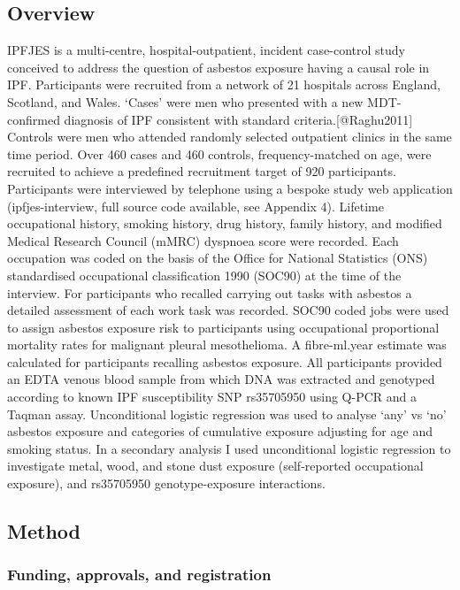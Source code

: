 \hypertarget{overview}{%
\subsection{Overview}\label{overview}}

IPFJES is a multi-centre, hospital-outpatient, incident case-control
study conceived to address the question of asbestos exposure having a
causal role in IPF. Participants were recruited from a network of 21
hospitals across England, Scotland, and Wales. `Cases' were men who
presented with a new MDT-confirmed diagnosis of IPF consistent with
standard criteria.{[}@Raghu2011{]} Controls were men who attended
randomly selected outpatient clinics in the same time period. Over 460
cases and 460 controls, frequency-matched on age, were recruited to
achieve a predefined recruitment target of 920 participants.
Participants were interviewed by telephone using a bespoke study web
application (ipfjes-interview, full source code available, see Appendix
4). Lifetime occupational history, smoking history, drug history, family
history, and modified Medical Research Council (mMRC) dyspnoea score
were recorded. Each occupation was coded on the basis of the Office for
National Statistics (ONS) standardised occupational classification 1990
(SOC90) at the time of the interview. For participants who recalled
carrying out tasks with asbestos a detailed assessment of each work task
was recorded. SOC90 coded jobs were used to assign asbestos exposure
risk to participants using occupational proportional mortality rates for
malignant pleural mesothelioma. A fibre-ml.year estimate was calculated
for participants recalling asbestos exposure. All participants provided
an EDTA venous blood sample from which DNA was extracted and genotyped
according to known IPF susceptibility SNP rs35705950 using Q-PCR and a
Taqman assay. Unconditional logistic regression was used to analyse
`any' vs `no' asbestos exposure and categories of cumulative exposure
adjusting for age and smoking status. In a secondary analysis I used
unconditional logistic regression to investigate metal, wood, and stone
dust exposure (self-reported occupational exposure), and rs35705950
genotype-exposure interactions.

\hypertarget{method}{%
\subsection{Method}\label{method}}

\hypertarget{funding-approvals-and-registration}{%
\subsubsection{Funding, approvals, and
registration}\label{funding-approvals-and-registration}}

